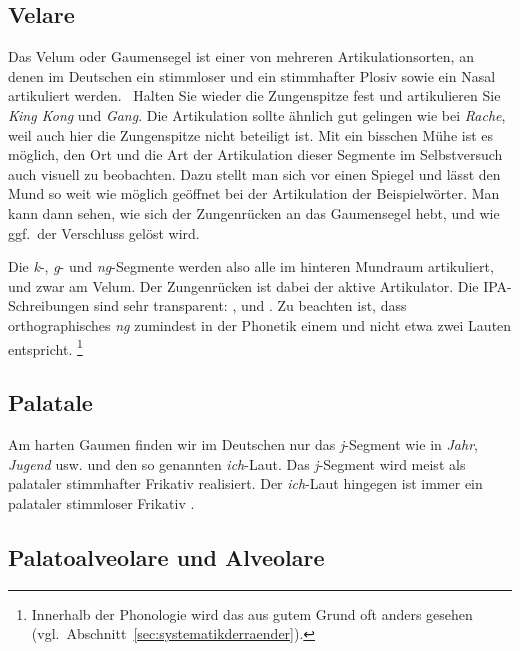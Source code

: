 \subsection{Velare}

\label{sec:velare}


Das Velum oder Gaumensegel ist einer von mehreren Artikulationsorten, an denen im Deutschen ein stimmloser und ein stimmhafter Plosiv sowie ein Nasal artikuliert werden.
\TuBegin~Halten Sie wieder die Zungenspitze fest und artikulieren Sie \textit{King Kong} und \textit{Gang}.
Die Artikulation sollte ähnlich gut gelingen wie bei \textit{Rache}, weil auch hier die Zungenspitze nicht beteiligt ist.
Mit ein bisschen Mühe ist es möglich, den Ort und die Art der Artikulation dieser Segmente im Selbstversuch auch visuell zu beobachten.
Dazu stellt man sich vor einen Spiegel und lässt den Mund so weit wie möglich geöffnet bei der Artikulation der Beispielwörter.
Man kann dann sehen, wie sich der Zungenrücken an das Gaumensegel hebt, und wie ggf.\ der Verschluss gelöst wird.

Die \textit{k}-, \textit{g}- und \textit{ng}-Segmente werden also alle im hinteren Mundraum artikuliert, und zwar am Velum.
Der Zungenrücken ist dabei der aktive Artikulator.
Die IPA-Schreibungen sind sehr transparent: \textipa{[k]}, \textipa{[g]} und \textipa{[N]}.
Zu beachten ist, dass orthographisches \textit{ng} zumindest in der Phonetik einem und nicht etwa zwei Lauten entspricht.%
\footnote{Innerhalb der Phonologie wird das aus gutem Grund oft anders gesehen (vgl.\ Abschnitt~\ref{sec:systematikderraender}).}

\subsection{Palatale}


Am harten Gaumen finden wir im Deutschen nur das \textit{j}-Segment wie in \textit{Jahr}, \textit{Jugend} usw. und den so genannten \textit{ich}-Laut.
Das \textit{j}-Segment wird meist als palataler stimmhafter Frikativ \textipa{[J]} realisiert.
Der \textit{ich}-Laut hingegen ist immer ein palataler stimmloser Frikativ \textipa{[\c{c}]}.

\subsection{Palatoalveolare und Alveolare}

